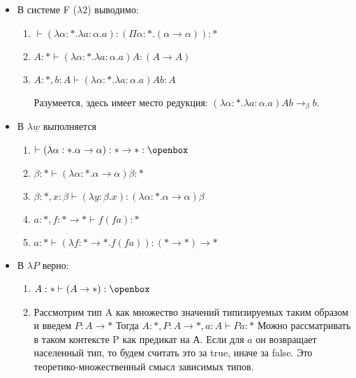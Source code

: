 \begin{itemize}

	\item В системе F ($\lambda 2$) выводимо:

	\begin{enumerate}
		\item $\vdash (\lambda \alpha : * . \lambda a : \alpha . a) : (\Pi \alpha : * . (\alpha \rightarrow \alpha)) : *$

		\item $A : * \vdash (\lambda \alpha : * . \lambda a : \alpha . a) A : (A \rightarrow A)$

		\item $A : *, b : A \vdash (\lambda \alpha : * . \lambda a : \alpha . a) A b : A$

		Разумеется, здесь имеет место редукция: $(\lambda \alpha : * . \lambda a : \alpha . a) A b \rightarrow_\beta b$.

	\end{enumerate}

	\item В $\lambda \underline{w}$ выполняется

	\begin{enumerate}
		\item $\vdash (\lambda \alpha : *. \alpha \rightarrow \alpha) : * \rightarrow * : \openbox$

		\item $\beta : * \vdash (\lambda \alpha : *. \alpha \rightarrow \alpha) \beta : *$

		\item $\beta : *, x : \beta \vdash (\lambda y : \beta . x) : (\lambda \alpha : *. \alpha \rightarrow \alpha) \beta$

		\item $a : *, f : * \rightarrow * \vdash f(fa) : *$

		\item $a : * \vdash (\lambda f : * \rightarrow * . f (f a)) : (* \rightarrow *) \rightarrow * $
	\end{enumerate}

	\item В $\lambda P$ верно:

	\begin{enumerate}
	    \item $A : * \vdash (A \rightarrow *) : \openbox$

	    \item Рассмотрим тип A как множество значений типизируемых таким образом и введем $P : A \rightarrow *$
	    Тогда $A : *, P : A \rightarrow * , a : A \vdash P a : *$
	    Можно рассматривать в таком контексте P как предикат на А. Если для $a$ он возвращает населенный тип, то будем считать это за true, иначе за false. Это теоретико-множественный смысл зависимых типов.


\end{enumerate}
\end{itemize}
